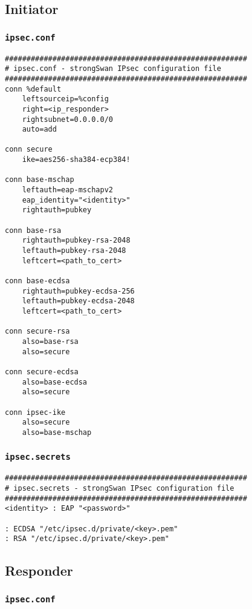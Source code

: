 \documentclass[
10pt, %
a4paper, %
oneside, %
headinclude,footinclude, %
BCOR5mm, %
]{scrartcl}
\begin{document}
\subsection{Initiator}

\subsubsection*{\lstinline|ipsec.conf|}
\begin{lstlisting}
########################################################
# ipsec.conf - strongSwan IPsec configuration file
########################################################
conn %default
    leftsourceip=%config
    right=<ip_responder>
    rightsubnet=0.0.0.0/0
    auto=add

conn secure
    ike=aes256-sha384-ecp384!

conn base-mschap
    leftauth=eap-mschapv2
    eap_identity="<identity>"
    rightauth=pubkey

conn base-rsa
    rightauth=pubkey-rsa-2048
    leftauth=pubkey-rsa-2048
    leftcert=<path_to_cert>

conn base-ecdsa
    rightauth=pubkey-ecdsa-256
    leftauth=pubkey-ecdsa-2048
    leftcert=<path_to_cert>

conn secure-rsa
    also=base-rsa
    also=secure

conn secure-ecdsa
    also=base-ecdsa
    also=secure

conn ipsec-ike
    also=secure
    also=base-mschap
\end{lstlisting}
\newpage

\subsubsection*{\lstinline|ipsec.secrets|}
\begin{lstlisting}
########################################################
# ipsec.secrets - strongSwan IPsec configuration file
########################################################
<identity> : EAP "<password>"

: ECDSA "/etc/ipsec.d/private/<key>.pem"
: RSA "/etc/ipsec.d/private/<key>.pem"

\end{lstlisting}

\subsection{Responder}

\subsubsection*{\lstinline|ipsec.conf|}
\end{document}
